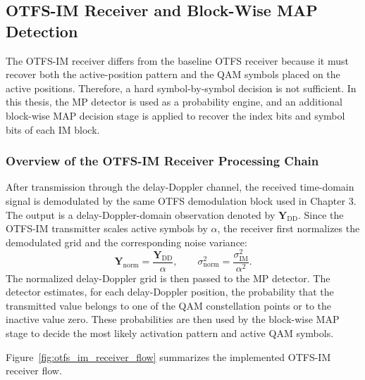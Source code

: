 \subsection{OTFS-IM Receiver and Block-Wise MAP Detection}

The OTFS-IM receiver differs from the baseline OTFS receiver because it must recover both the active-position pattern and the QAM symbols placed on the active positions. Therefore, a hard symbol-by-symbol decision is not sufficient. In this thesis, the MP detector is used as a probability engine, and an additional block-wise MAP decision stage is applied to recover the index bits and symbol bits of each IM block.

\subsubsection{Overview of the OTFS-IM Receiver Processing Chain}

After transmission through the delay-Doppler channel, the received time-domain signal is demodulated by the same OTFS demodulation block used in Chapter 3. The output is a delay-Doppler-domain observation denoted by \(\mathbf{Y}_{\mathrm{DD}}\). Since the OTFS-IM transmitter scales active symbols by \(\alpha\), the receiver first normalizes the demodulated grid and the corresponding noise variance:
\begin{equation}
    \mathbf{Y}_{\mathrm{norm}}
    =
    \frac{\mathbf{Y}_{\mathrm{DD}}}{\alpha},
    \qquad
    \sigma^2_{\mathrm{norm}}
    =
    \frac{\sigma^2_{\mathrm{IM}}}{\alpha^2}.
    \label{eq:otfs_im_receiver_normalization}
\end{equation}
The normalized delay-Doppler grid is then passed to the MP detector. The detector estimates, for each delay-Doppler position, the probability that the transmitted value belongs to one of the QAM constellation points or to the inactive value zero. These probabilities are then used by the block-wise MAP stage to decide the most likely activation pattern and active QAM symbols.

Figure~\ref{fig:otfs_im_receiver_flow} summarizes the implemented OTFS-IM receiver flow.

